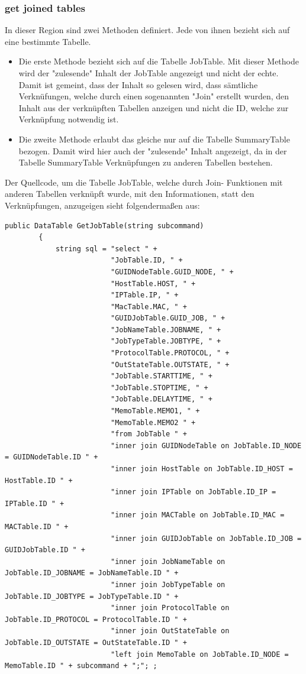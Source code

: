 \documentclass[12pt,a4paper]{report}
\begin{document}
\begin{onehalfspace}
\subsubsection{get joined tables}
In dieser Region sind zwei Methoden definiert. Jede von ihnen bezieht sich auf eine bestimmte Tabelle.
\begin{itemize}
\item Die erste Methode bezieht sich auf die Tabelle JobTable. Mit dieser Methode wird der "{}zulesende"{} Inhalt der JobTable angezeigt und nicht der echte. Damit ist gemeint, dass der Inhalt so gelesen wird, dass sämtliche Verknüfungen, welche durch einen sogenannten "{}Join"{} erstellt wurden, den Inhalt aus der verknüpften Tabellen anzeigen und nicht die ID, welche zur Verknüpfung notwendig ist.
\item Die zweite Methode erlaubt das gleiche nur auf die Tabelle SummaryTable bezogen. Damit wird hier auch der "{}zulesende"{} Inhalt angezeigt, da in der Tabelle SummaryTable Verknüpfungen zu anderen Tabellen bestehen.
\end{itemize}
Der Quellcode, um die Tabelle JobTable, welche durch Join- Funktionen mit anderen Tabellen verknüpft wurde, mit den Informationen, statt den Verknüpfungen, anzugeigen sieht folgendermaßen aus:
\begin{lstlisting}
public DataTable GetJobTable(string subcommand)
        {
            string sql = "select " +
                         "JobTable.ID, " +
                         "GUIDNodeTable.GUID_NODE, " +
                         "HostTable.HOST, " +
                         "IPTable.IP, " +
                         "MacTable.MAC, " +
                         "GUIDJobTable.GUID_JOB, " +
                         "JobNameTable.JOBNAME, " +
                         "JobTypeTable.JOBTYPE, " +
                         "ProtocolTable.PROTOCOL, " +
                         "OutStateTable.OUTSTATE, " +
                         "JobTable.STARTTIME, " +
                         "JobTable.STOPTIME, " +
                         "JobTable.DELAYTIME, " +
                         "MemoTable.MEMO1, " +
                         "MemoTable.MEMO2 " +
                         "from JobTable " +
                         "inner join GUIDNodeTable on JobTable.ID_NODE = GUIDNodeTable.ID " +
                         "inner join HostTable on JobTable.ID_HOST = HostTable.ID " +
                         "inner join IPTable on JobTable.ID_IP = IPTable.ID " +
                         "inner join MACTable on JobTable.ID_MAC = MACTable.ID " +
                         "inner join GUIDJobTable on JobTable.ID_JOB = GUIDJobTable.ID " +
                         "inner join JobNameTable on JobTable.ID_JOBNAME = JobNameTable.ID " +
                         "inner join JobTypeTable on JobTable.ID_JOBTYPE = JobTypeTable.ID " +
                         "inner join ProtocolTable on JobTable.ID_PROTOCOL = ProtocolTable.ID " +
                         "inner join OutStateTable on JobTable.ID_OUTSTATE = OutStateTable.ID " +
                         "left join MemoTable on JobTable.ID_NODE = MemoTable.ID " + subcommand + ";"; ;


\end{lstlisting}
\end{onehalfspace}
\end{document}
